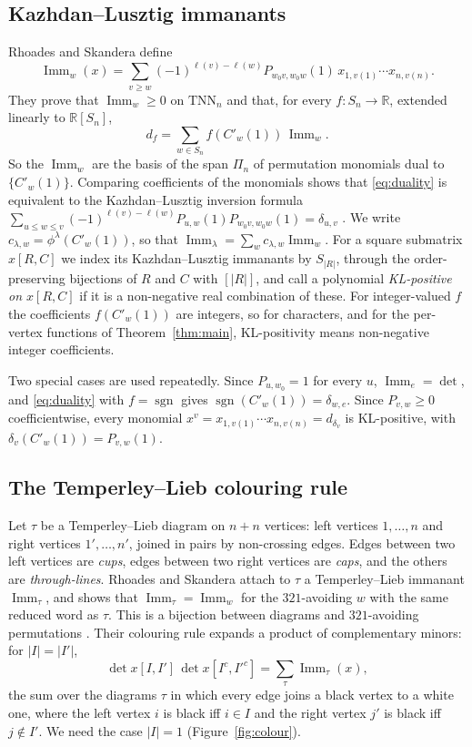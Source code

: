 \documentclass[11pt]{amsart}
\theoremstyle{definition}
\theoremstyle{remark}
\newcommand{\R}{\mathbb{R}}
\newcommand{\Imm}{\operatorname{Imm}}
\newcommand{\TNN}{\mathrm{TNN}}
\newcommand{\sgn}{\operatorname{sgn}}
\newcommand{\Cp}[1]{C'_{#1}(1)}
\begin{document}
\subsection{Kazhdan--Lusztig immanants}
Rhoades and Skandera \cite{RS06} define
\[
  \Imm_w(x)=\sum_{v\ge w}(-1)^{\ell(v)-\ell(w)}P_{w_0v,w_0w}(1)\,x_{1,v(1)}\cdots x_{n,v(n)}.
\]
They prove that $\Imm_w\ge0$ on $\TNN_n$ and that, for every $f\colon S_n\to\R$, extended linearly to $\R[S_n]$,
\begin{equation}\label{eq:duality}
  d_f=\sum_{w\in S_n}f(\Cp w)\,\Imm_w .
\end{equation}
So the $\Imm_w$ are the basis of the span $\Pi_n$ of permutation monomials dual to $\{\Cp w\}$. Comparing coefficients of the monomials shows that \eqref{eq:duality} is equivalent to the Kazhdan--Lusztig inversion formula $\sum_{u\le w\le v}(-1)^{\ell(v)-\ell(w)}P_{u,w}(1)P_{w_0v,w_0w}(1)=\delta_{u,v}$ \cite[Thm.~3.1]{KL79}. We write $c_{\lambda,w}=\phi^\lambda(\Cp w)$, so that $\Imm_\lambda=\sum_wc_{\lambda,w}\Imm_w$. For a square submatrix $x[R,C]$ we index its Kazhdan--Lusztig immanants by $S_{|R|}$, through the order-preserving bijections of $R$ and $C$ with $[|R|]$, and call a polynomial \emph{KL-positive on $x[R,C]$} if it is a non-negative real combination of these. For integer-valued $f$ the coefficients $f(\Cp w)$ are integers, so for characters, and for the per-vertex functions of Theorem~\ref{thm:main}, KL-positivity means non-negative integer coefficients.

Two special cases are used repeatedly. Since $P_{u,w_0}=1$ for every $u$, $\Imm_e=\det$, and \eqref{eq:duality} with $f=\sgn$ gives $\sgn(\Cp w)=\delta_{w,e}$. Since $P_{v,w}\ge0$ coefficientwise, every monomial $x^v=x_{1,v(1)}\cdots x_{n,v(n)}=d_{\delta_v}$ is KL-positive, with $\delta_v(\Cp w)=P_{v,w}(1)$.

\subsection{The Temperley--Lieb colouring rule}
Let $\tau$ be a Temperley--Lieb diagram on $n+n$ vertices: left vertices $1,\dots,n$ and right vertices $1',\dots,n'$, joined in pairs by non-crossing edges. Edges between two left vertices are \emph{cups}, edges between two right vertices are \emph{caps}, and the others are \emph{through-lines}. Rhoades and Skandera \cite{RS05} attach to $\tau$ a Temperley--Lieb immanant $\Imm_\tau$, and \cite[Prop.~3.2]{RS06} shows that $\Imm_\tau=\Imm_w$ for the $321$-avoiding $w$ with the same reduced word as $\tau$. This is a bijection between diagrams and $321$-avoiding permutations \cite{FG}. Their colouring rule \cite[Prop.~4.3]{RS05} expands a product of complementary minors: for $|I|=|I'|$,
\[
\det x[I,I']\,\det x[I^c,I'^c]=\sum_\tau\Imm_\tau(x),
\]
the sum over the diagrams $\tau$ in which every edge joins a black vertex to a white one, where the left vertex $i$ is black iff $i\in I$ and the right vertex $j'$ is black iff $j\notin I'$. We need the case $|I|=1$ (Figure~\ref{fig:colour}).
\end{document}
